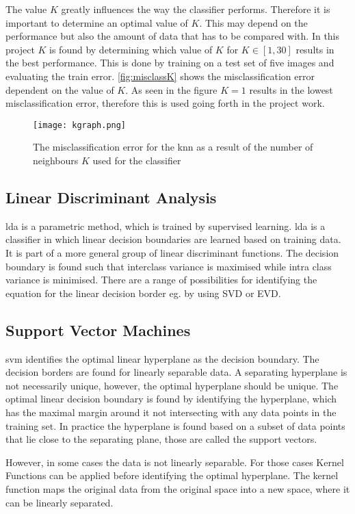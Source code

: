 The value $K$ greatly influences the way the classifier performs. Therefore it is important to determine an optimal value of $K$. This may depend on the performance but also the amount of data that has to be compared with. In this project $K$ is found by determining which value of $K$ for $K\in[1,30]$ results in the best performance. This is done by training on a test set of five images and evaluating the train error. \autoref{fig:misclassK} shows the misclassification error dependent on the value of $K$. As seen in the figure $K=1$ results in the lowest misclassification error, therefore this is used going forth in the project work.  
 \begin{figure}[H]
\centering
\texttt{[image: kgraph.png]}
\caption{The misclassification error for the \gls{knn} as a result of the number of neighbours $K$ used for the classifier}
\label{fig:misclassK}
\end{figure}
\subsection{Linear Discriminant Analysis}
\gls{lda} is a parametric method, which is trained by supervised learning. \gls{lda} is a classifier in which linear decision boundaries are learned based on training data. It is part of a more general group of linear discriminant functions. The decision boundary is found such that interclass variance is maximised while intra class variance is minimised. There are a range of possibilities for identifying the equation for the linear decision border eg. by using SVD or EVD.    

\subsection{Support Vector Machines}
\gls{svm} identifies the optimal linear hyperplane as the decision boundary. The decision borders are found for linearly separable data. A separating hyperplane is not necessarily unique, however, the optimal hyperplane should be unique. The optimal linear decision boundary is found by identifying the hyperplane, which has the maximal margin around it not intersecting with any data points in the training set.
In practice the hyperplane is found based on a subset of data points that lie close to the separating plane, those are called the support vectors.    

However, in some cases the data is not linearly separable. For those cases Kernel Functions can be applied before identifying the optimal hyperplane. The kernel function maps the original data from the original space into a new space, where it can be linearly separated.  

